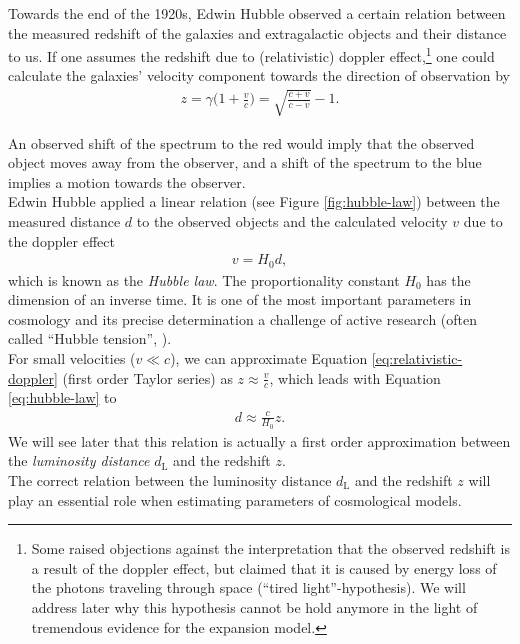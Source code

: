 \noindent Towards the end of the 1920s, Edwin Hubble observed a certain relation between the measured redshift of the galaxies and extragalactic objects and their distance to us. If one assumes the redshift due to (relativistic) doppler effect,\footnote{Some raised objections against the interpretation that the observed redshift is a result of the doppler effect, but claimed that it is caused by energy loss of the photons traveling through space (``tired light''-hypothesis). We will address later why this hypothesis cannot be hold anymore in the light of tremendous evidence for the expansion model.} one could calculate the galaxies' velocity component towards the direction of observation by
\begin{align}
    z = \gamma \biggl( 1 + \frac{v}{c} \biggr) = \sqrt{\frac{c + v}{c - v}} - 1. \label{eq:relativistic-doppler}
\end{align} 

\noindent An observed shift of the spectrum to the red would imply that the observed object moves away from the observer, and a shift of the spectrum to the blue implies a motion towards the observer. \\
\noindent Edwin Hubble applied a linear relation (see Figure \ref{fig:hubble-law}) between the measured distance $d$ to the observed objects and the calculated velocity $v$ due to the doppler effect
\begin{align}
    v = H_{0} d, \label{eq:hubble-law}
\end{align}
which is known as the \textit{Hubble law}. The proportionality constant $H_{0}$ has the dimension of an inverse time. It is one of the most important parameters in cosmology and its precise determination a challenge of active research (often called ``Hubble tension'', \cite{DiValentino2021}). \\ 

\noindent For small velocities ($v \ll c$), we can approximate Equation \eqref{eq:relativistic-doppler} (first order Taylor series) as $\displaystyle z \approx \frac{v}{c}$, which leads with Equation \eqref{eq:hubble-law} to 
\begin{align}
    d \approx \frac{c}{H_{0}} z. \label{eq:lum-dist-approx} 
\end{align}
We will see later that this relation is actually a first order approximation between the \textit{luminosity distance} $d_{\text{L}}$ and the redshift $z$. \\
The correct relation between the luminosity distance $d_{\text{L}}$ and the redshift $z$ will play an essential role when estimating parameters of cosmological models.

